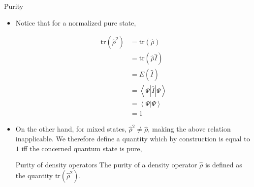 \documentclass[9pt,handout]{beamer}
\newcommand{\tr}[0]{\text{tr}}
\begin{document}
\begin{frame}{Purity}
\begin{itemize}
\item Notice that for a normalized pure state,

\begin{align*}
\tr \left( \widehat{\rho}^2 \right) & = \tr \left( \widehat{\rho} \right) \\
& = \tr \left( \widehat{\rho} \widehat{I} \right) \\
& = E \left( \widehat{I} \right) \\
& = \left\langle \Psi \left\lvert \widehat{I} \right\rvert \Psi \right\rangle \\
& = \left\langle \Psi \right\rvert \left. \Psi \right\rangle \\
& = 1
\end{align*}

\item On the other hand, for mixed states, $\widehat{\rho}^2 \neq \widehat{\rho}$, making the above relation inapplicable. We therefore define a quantity which by construction is equal to $1$ iff the concerned quantum state is pure,

\begin{block}{Purity of density operators}
The purity of a density operator $\widehat{\rho}$ is defined as the quantity $\tr \left( \widehat{\rho}^2 \right)$.
\end{block}
\end{itemize}
\end{frame}
\end{document}
